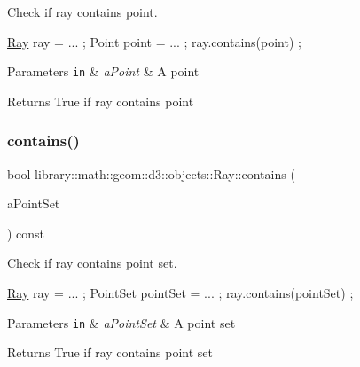Check if ray contains point. 


\begin{DoxyCode}
\hyperlink{classlibrary_1_1math_1_1geom_1_1d3_1_1objects_1_1_ray_a11b7613464daaebc6e25a758b057f203}{Ray} ray = ... ;
Point point = ... ;
ray.contains(point) ;
\end{DoxyCode}



\begin{DoxyParams}[1]{Parameters}
\mbox{\tt in}  & {\em a\+Point} & A point \\
\hline
\end{DoxyParams}
\begin{DoxyReturn}{Returns}
True if ray contains point 
\end{DoxyReturn}
\mbox{\label{classlibrary_1_1math_1_1geom_1_1d3_1_1objects_1_1_ray_a4766780e22a8113ff63b85c8af32e915}} 
\subsubsection{\texorpdfstring{contains()}{contains()}\hspace{0.1cm}{\footnotesize\ttfamily [2/2]}}
{\footnotesize\ttfamily bool library\+::math\+::geom\+::d3\+::objects\+::\+Ray\+::contains (\begin{DoxyParamCaption}\item[{const \hyperlink{classlibrary_1_1math_1_1geom_1_1d3_1_1objects_1_1_point_set}{Point\+Set} \&}]{a\+Point\+Set }\end{DoxyParamCaption}) const}



Check if ray contains point set. 


\begin{DoxyCode}
\hyperlink{classlibrary_1_1math_1_1geom_1_1d3_1_1objects_1_1_ray_a11b7613464daaebc6e25a758b057f203}{Ray} ray = ... ;
PointSet pointSet = ... ;
ray.contains(pointSet) ;
\end{DoxyCode}



\begin{DoxyParams}[1]{Parameters}
\mbox{\tt in}  & {\em a\+Point\+Set} & A point set \\
\hline
\end{DoxyParams}
\begin{DoxyReturn}{Returns}
True if ray contains point set 
\end{DoxyReturn}
\mbox{\label{classlibrary_1_1math_1_1geom_1_1d3_1_1objects_1_1_ray_ab2e0a6cfd7c2c288ec615a479024fb7d}} 
